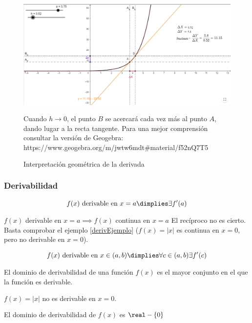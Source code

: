 \begin{figure}[hbp]
\centering
\includegraphics[scale=0.5]{img/DerivadaInterGeometrica}
\label{fig::funinterpretacionderivadapunto}
\caption{Interpretación geométrica de la derivada} Cuando $h\to0$, el punto $B$ se acercará cada vez más al punto $A$, dando lugar a la recta tangente. 
%
Para una mejor comprensión consultar la versión de Geogebra: https://www.geogebra.org/m/jwtw6mdt\#material/f52nQ7T5

\end{figure} 


\subsubsection{Derivabilidad}
\begin{defn}
\[f(x) \text{ derivable en } x=a\dimplies \exists f'(a)\]
\end{defn}

\begin{prop}
$f(x)$ derivable en $x=a \implies f(x)$ continua en $x=a$
\obs El recíproco no es cierto. Basta comprobar el ejemplo \ref{derivEjemplo} ($f(x) = |x|$ es continua en $x=0$, pero no derivable en $x=0$).
\end{prop}

\begin{defn}
\[f(x) \text{ derivable en } x\in(a,b) \dimplies \forall c\in(a,b) \exists f'(c) \]
\end{defn}

\begin{defn}
El dominio de derivabilidad de una función $f(x)$ es el mayor conjunto en el que la función es derivable.
\end{defn}

\begin{example}
$f(x) = |x|$ no es derivable en $x=0$.

El dominio de derivabilidad de $f(x)$ es $\real-\{0\}$
\end{example}


